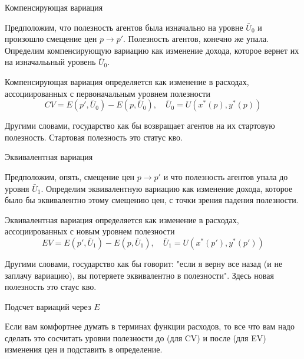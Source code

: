 \documentclass{beamer}
\begin{document}
\begin{frame}{Компенсирующая вариация}

Предположим, что полезность агентов была изначально на уровне $\bar U_0$ и произошло смещение цен $p \to p'$. Полезность агентов, конечно же упала. Определим компенсирующую вариацию как изменение дохода, которое вернет их на изначалььный уровень $\bar U_0$.

\begin{definition} Компенсирующая вариация определяется как изменение в расходах, ассоциированных с первоначальным уровнем полезности
$$CV = E(p',\bar U_0) - E(p,\bar U_0), \quad \bar U_0 = U(x^{\ast}(p), y^{\ast}(p))$$

\end{definition}

Другими словами, государство как бы возвращает агентов на их стартовую полезность. Стартовая полезность это статус кво.

\end{frame}

\begin{frame}{Эквивалентная вариация}

Предположим, опять, смещение цен $p \to p'$ и что полезность агентов упала до уровня $\bar U_1$. Определим эквивалентную вариацию как изменение дохода, которое было бы эквивалентно этому смещению цен, с точки зрения падения полезности.

\begin{definition}

Эквивалентная вариация определяется как изменение в расходах, ассоциированных с новым уровнем полезности
$$EV = E(p',\bar U_1) - E(p,\bar U_1), \quad \bar U_1 = U(x^{\ast}(p'), y^{\ast}(p'))$$
\end{definition}

Другими словами, государство как бы говорит: "если я верну все назад (и не заплачу вариацию), вы потеряете эквивалентно в полезности". Здесь новая полезность это стаус кво.

\end{frame}

\begin{frame}{Подсчет вариаций через $E$}

Если вам комфортнее думать в терминах функции расходов, то все что вам надо сделать это сосчитать уровни полезности до (для CV) и после (для EV) изменения цен и подставить в определение.

\end{frame}
\end{document}
